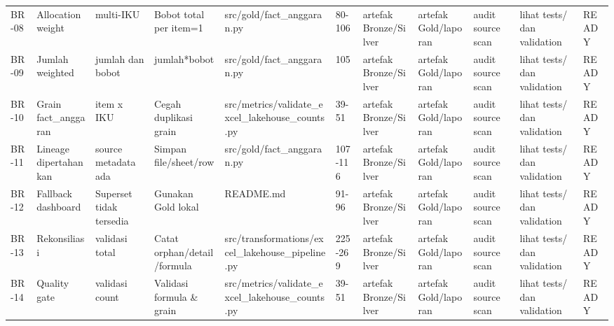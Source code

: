 \begin{longtable}{lllllllllll}
BR-08 & Allocation weight & multi-IKU & Bobot total per item=1 & src/gold/fact\_anggaran.py & 80-106 & artefak Bronze/Silver & artefak Gold/laporan & audit source scan & lihat tests/ dan validation & READY \\
BR-09 & Jumlah weighted & jumlah dan bobot & jumlah*bobot & src/gold/fact\_anggaran.py & 105 & artefak Bronze/Silver & artefak Gold/laporan & audit source scan & lihat tests/ dan validation & READY \\
BR-10 & Grain fact\_anggaran & item x IKU & Cegah duplikasi grain & src/metrics/validate\_excel\_lakehouse\_counts.py & 39-51 & artefak Bronze/Silver & artefak Gold/laporan & audit source scan & lihat tests/ dan validation & READY \\
BR-11 & Lineage dipertahankan & source metadata ada & Simpan file/sheet/row & src/gold/fact\_anggaran.py & 107-116 & artefak Bronze/Silver & artefak Gold/laporan & audit source scan & lihat tests/ dan validation & READY \\
BR-12 & Fallback dashboard & Superset tidak tersedia & Gunakan Gold lokal & README.md & 91-96 & artefak Bronze/Silver & artefak Gold/laporan & audit source scan & lihat tests/ dan validation & READY \\
BR-13 & Rekonsiliasi & validasi total & Catat orphan/detail/formula & src/transformations/excel\_lakehouse\_pipeline.py & 225-269 & artefak Bronze/Silver & artefak Gold/laporan & audit source scan & lihat tests/ dan validation & READY \\
BR-14 & Quality gate & validasi count & Validasi formula \& grain & src/metrics/validate\_excel\_lakehouse\_counts.py & 39-51 & artefak Bronze/Silver & artefak Gold/laporan & audit source scan & lihat tests/ dan validation & READY \\
\end{longtable}
\endgroup
